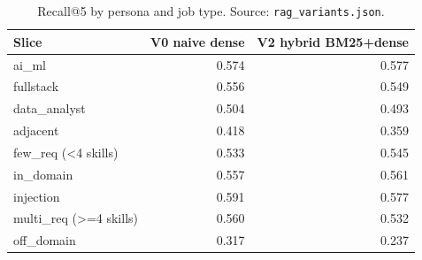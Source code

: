 \begin{table}[t]\centering\small\caption{Recall@5 by persona and job type. Source: \texttt{rag\_variants.json}.}\label{tab:ragbreak}
\begin{tabular}{lrr}\toprule Slice & V0 naive dense & V2 hybrid BM25+dense\\\midrule
ai\_ml & 0.574 & 0.577 \\
fullstack & 0.556 & 0.549 \\
data\_analyst & 0.504 & 0.493 \\
\midrule
adjacent & 0.418 & 0.359 \\
few\_req (<4 skills) & 0.533 & 0.545 \\
in\_domain & 0.557 & 0.561 \\
injection & 0.591 & 0.577 \\
multi\_req (>=4 skills) & 0.560 & 0.532 \\
off\_domain & 0.317 & 0.237 \\
\bottomrule\end{tabular}\end{table}
